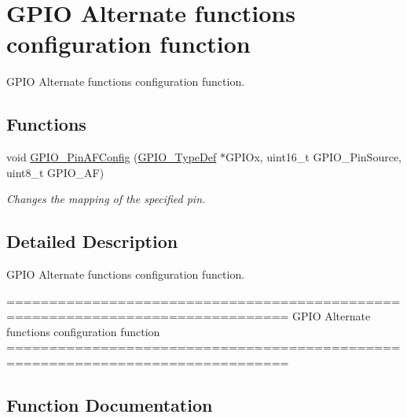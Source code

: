 \hypertarget{group___g_p_i_o___group3}{}\section{G\+P\+I\+O Alternate functions configuration function}
\label{group___g_p_i_o___group3}


G\+P\+I\+O Alternate functions configuration function.  


\subsection*{Functions}
\begin{DoxyCompactItemize}
\item 
void \hyperlink{group___g_p_i_o___group3_ga0a77617a322562ae84f8d72486032c5d}{G\+P\+I\+O\+\_\+\+Pin\+A\+F\+Config} (\hyperlink{struct_g_p_i_o___type_def}{G\+P\+I\+O\+\_\+\+Type\+Def} $\ast$G\+P\+I\+Ox, uint16\+\_\+t G\+P\+I\+O\+\_\+\+Pin\+Source, uint8\+\_\+t G\+P\+I\+O\+\_\+\+A\+F)
\begin{DoxyCompactList}\small\item\em Changes the mapping of the specified pin. \end{DoxyCompactList}\end{DoxyCompactItemize}


\subsection{Detailed Description}
G\+P\+I\+O Alternate functions configuration function. 

\begin{DoxyVerb} ===============================================================================
               GPIO Alternate functions configuration function
 ===============================================================================  \end{DoxyVerb}
 

\subsection{Function Documentation}
\hypertarget{group___g_p_i_o___group3_ga0a77617a322562ae84f8d72486032c5d}{}
